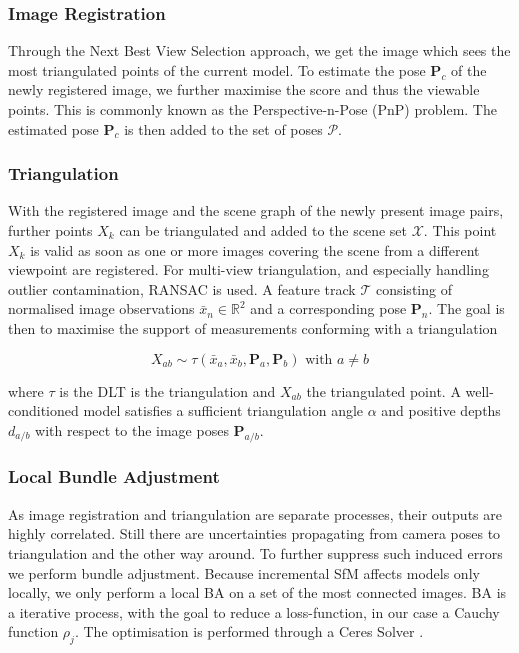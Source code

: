 \documentclass[conference,]{IEEEtran}
\begin{document}
\hypertarget{image-registration}{%
\subsubsection{Image Registration}\label{image-registration}}

Through the Next Best View Selection approach, we get the image which
sees the most triangulated points of the current model. To estimate the
pose \(\mathbf{P}_c\) of the newly registered image, we further maximise
the score and thus the viewable points. This is commonly known as the
Perspective-n-Pose (PnP) \autocite{fischler1981} problem. The estimated
pose \(\mathbf{P}_c\) is then added to the set of poses \(\mathcal{P}\).
\autocite{schönberger2016}

\hypertarget{triangulation}{%
\subsubsection{Triangulation}\label{triangulation}}

With the registered image and the scene graph of the newly present image
pairs, further points \(X_k\) can be triangulated and added to the scene
set \(\mathcal{X}\). This point \(X_k\) is valid as soon as one or more
images covering the scene from a different viewpoint are registered. For
multi-view triangulation, and especially handling outlier contamination,
RANSAC is used. A feature track \(\mathcal{T}\) consisting of normalised
image observations \(\bar{x}_n\in\mathbb{R}^2\) and a corresponding pose
\(\mathbf{P}_n\). The goal is then to maximise the support of
measurements conforming with a triangulation

\[
X_{ab}\sim \tau(\bar{x}_a,\bar{x}_b,\mathbf{P}_a,\mathbf{P}_b)\text{ with } a\neq b
\]

where \(\tau\) is the DLT \autocite{hartley2004} is the triangulation
and \(X_{ab}\) the triangulated point. A well-conditioned model
satisfies a sufficient triangulation angle \(\alpha\) and positive
depths \(d_{a/b}\) with respect to the image poses \(\mathbf{P}_{a/b}\).
\autocite{schönberger2016}

\hypertarget{local-bundle-adjustment}{%
\subsubsection{Local Bundle Adjustment}\label{local-bundle-adjustment}}

As image registration and triangulation are separate processes, their
outputs are highly correlated. Still there are uncertainties propagating
from camera poses to triangulation and the other way around. To further
suppress such induced errors we perform bundle adjustment. Because
incremental SfM affects models only locally, we only perform a local BA
on a set of the most connected images. BA is a iterative process, with
the goal to reduce a loss-function, in our case a Cauchy function
\(\rho_j\). The optimisation is performed through a Ceres Solver
\autocite{ceresso}. \autocite{schönberger2016}
\end{document}
